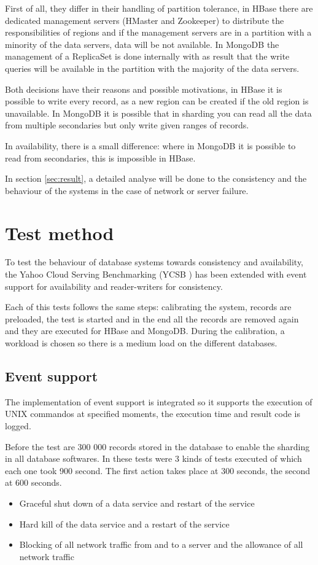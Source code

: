 \documentclass[10pt,conference,letterpaper]{IEEEtran}
\begin{document}
First of all, they differ in their handling of partition tolerance, in HBase there are dedicated management servers (HMaster and Zookeeper) to distribute the responsibilities of regions and if the management servers are in a partition with a minority of the data servers, data will be not available. In MongoDB the management of a ReplicaSet is done internally with as result that the write queries will be available in the partition with the majority of the data servers.

Both decisions have their reasons and possible motivations, in HBase it is possible to write every record, as a new region can be created if the old region is unavailable. In MongoDB it is possible that in sharding you can read all the data from multiple secondaries but only write given ranges of records.

In availability, there is a small difference: where in MongoDB it is possible to read from secondaries, this is impossible in HBase. 

In section \ref{sec:result}, a detailed analyse will be done to the consistency and the behaviour of the systems in the case of network or server failure. 

\section{Test method}\label{sec:testmethod}
To test the behaviour of database systems towards consistency and availability, the Yahoo Cloud Serving Benchmarking (YCSB \cite{cooper2010benchmarking}) has been extended with event support for availability and reader-writers for consistency.

Each of this tests follows the same steps: calibrating the system, records are preloaded, the test is started and in the end all the records are removed again and they are executed for HBase and MongoDB. During the calibration, a workload is chosen so there is a medium load on the different databases. 

\subsection{Event support}
The implementation of event support is integrated so it supports the execution of UNIX commandos at specified moments, the execution time and result code is logged. 

Before the test are 300 000 records stored in the database to enable the sharding in all database softwares. In these tests were 3 kinds of tests executed of which each one took 900 second. The first action takes place at 300 seconds, the second at 600 seconds.
\begin{itemize}
\item Graceful shut down of a data service and restart of the service
\item Hard kill of the data service and a restart of the service
\item Blocking of all network traffic from and to a server and the allowance of all network traffic
\end{itemize}
\end{document}

